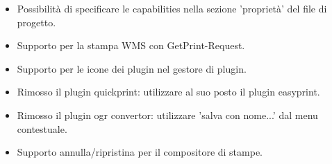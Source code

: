 
\begin{itemize}[label=--]
\item Possibilità di specificare le capabilities nella sezione 'proprietà' del file di progetto.
\item Supporto per la stampa WMS con GetPrint-Request.
\end{itemize}


\begin{itemize}[label=--]
\item Supporto per le icone dei plugin nel gestore di plugin.
\item Rimosso il plugin quickprint: utilizzare al suo posto il plugin easyprint.
\item Rimosso il plugin ogr convertor: utilizzare 'salva con nome...' dal menu contestuale.
\end{itemize}


\begin{itemize}[label=--]
\item Supporto annulla/ripristina per il compositore di stampe.
\end{itemize}

\newpage